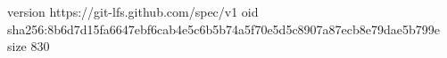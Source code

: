 version https://git-lfs.github.com/spec/v1
oid sha256:8b6d7d15fa6647ebf6cab4e5c6b5b74a5f70e5d5c8907a87ecb8e79dae5b799e
size 830
